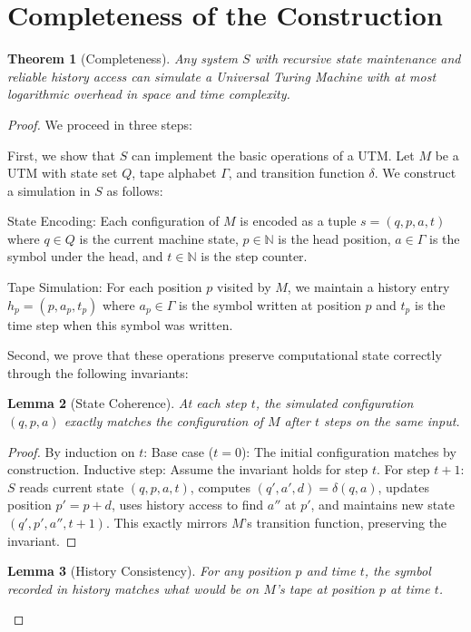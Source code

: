\documentclass[12pt]{article}
\newtheorem{theorem}{Theorem}
\newtheorem{lemma}[theorem]{Lemma}
\begin{document}
\section{Completeness of the Construction}

\begin{theorem}[Completeness]
Any system $S$ with recursive state maintenance and reliable history access can simulate a Universal Turing Machine with at most logarithmic overhead in space and time complexity.
\end{theorem}

\begin{proof}
We proceed in three steps:

First, we show that $S$ can implement the basic operations of a UTM. Let $M$ be a UTM with state set $Q$, tape alphabet $\Gamma$, and transition function $\delta$. We construct a simulation in $S$ as follows:

State Encoding: Each configuration of $M$ is encoded as a tuple $s = (q, p, a, t)$ where $q \in Q$ is the current machine state, $p \in \mathbb{N}$ is the head position, $a \in \Gamma$ is the symbol under the head, and $t \in \mathbb{N}$ is the step counter.

Tape Simulation: For each position $p$ visited by $M$, we maintain a history entry $h_p = (p, a_p, t_p)$ where $a_p \in \Gamma$ is the symbol written at position $p$ and $t_p$ is the time step when this symbol was written.

Second, we prove that these operations preserve computational state correctly through the following invariants:

\begin{lemma}[State Coherence]
At each step $t$, the simulated configuration $(q, p, a)$ exactly matches the configuration of $M$ after $t$ steps on the same input.
\end{lemma}

\begin{proof}
By induction on $t$:
Base case ($t=0$): The initial configuration matches by construction.
Inductive step: Assume the invariant holds for step $t$. For step $t+1$: $S$ reads current state $(q, p, a, t)$, computes $(q', a', d) = \delta(q, a)$, updates position $p' = p + d$, uses history access to find $a''$ at $p'$, and maintains new state $(q', p', a'', t+1)$. This exactly mirrors $M$'s transition function, preserving the invariant.
\end{proof}

\begin{lemma}[History Consistency]
For any position $p$ and time $t$, the symbol recorded in history matches what would be on $M$'s tape at position $p$ at time $t$.
\end{lemma}


\end{proof}
\end{document}
